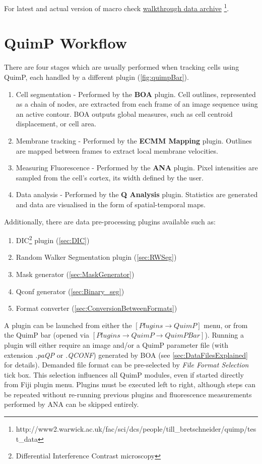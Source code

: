 \documentclass[a4paper,12pt]{article}
\begin{document}
For latest and actual version of macro check \href{http://www2.warwick.ac.uk/fac/sci/dcs/people/till\_bretschneider/quimp/test\_data]}{walkthrough data archive} \footnote{http://www2.warwick.ac.uk/fac/sci/dcs/people/till\_bretschneider/quimp/test\_data}.

\section{QuimP Workflow}

There are four stages which are usually performed when tracking cells using QuimP, each handled by a different plugin (\autoref{fig:quimpBar}).

\begin{enumerate}
	\item Cell segmentation - Performed by the \textbf{BOA} plugin.  Cell outlines, represented as a chain of nodes, are extracted from each frame of an image sequence using an active contour. BOA outputs global measures, such as cell centroid displacement, or cell area.
	\item Membrane tracking - Performed by the \textbf{ECMM Mapping} plugin.  Outlines are mapped between frames to extract local membrane velocities.
	\item Measuring Fluorescence - Performed by the \textbf{ANA} plugin.  Pixel intensities are sampled from the cell's cortex, its width defined by the user.
	\item Data analysis - Performed by the \textbf{Q Analysis} plugin. Statistics are generated and data are visualised in the form of spatial-temporal maps.
\end{enumerate}

Additionally, there are data pre-processing plugins available such as:

\begin{enumerate}
	\item DIC\footnote{Differential Interference Contrast microscopy} plugin (\autoref{sec:DIC})
	\item Random Walker Segmentation plugin (\autoref{sec:RWSeg})
	\item Mask generator (\autoref{sec:MaskGenerator})
	\item Qconf generator (\autoref{sec:Binary_seg})
	\item Format converter (\autoref{sec:ConversionBetweenFormats})
\end{enumerate}

A plugin can be launched from either the $[Plugins\rightarrow QuimP]$ menu, or from the QuimP bar
(opened via $[Plugins\rightarrow QuimP\rightarrow QuimP Bar]$).
Running a plugin will either require an image and/or a QuimP parameter file (with extension \textit{.paQP} or  \textit{.QCONF}) generated by BOA (see \autoref{sec:DataFilesExplained} for details). Demanded file format can be pre-selected by \textit{File Format Selection} tick box. This selection influences all QuimP modules, even if started directly from Fiji plugin menu.
Plugins must be executed left to right, although steps can be repeated without re-running previous plugins and fluorescence measurements performed by ANA can be skipped entirely.
\end{document}
